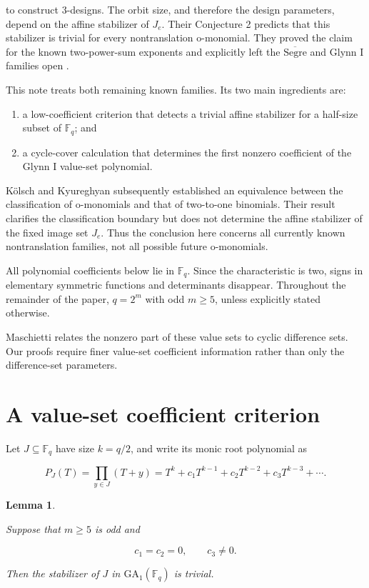 \documentclass[11pt]{article}
\newtheorem{lemma}[theorem]{Lemma}
\begin{document}
to construct \(3\)-designs. The orbit size, and therefore the design parameters,
depend on the affine stabilizer of \(J_e\). Their Conjecture 2 predicts that this
stabilizer is trivial for every nontranslation o-monomial. They proved the claim
for the known two-power-sum exponents and explicitly left the
\(\overline{\mathrm{Segre}}\) and Glynn I families open \cite[after Corollary~30]{ding-tang}.

This note treats both remaining known families. Its two main ingredients are:

\begin{enumerate}
\item a low-coefficient criterion that detects a trivial affine stabilizer for a
half-size subset of \(\mathbb F_q\); and
\item a cycle-cover calculation that determines the first nonzero coefficient of
the Glynn I value-set polynomial.

\end{enumerate}

Kölsch and Kyureghyan \cite{kolsch-kyureghyan} subsequently established an equivalence between the
classification of o-monomials and that of two-to-one binomials. Their result
clarifies the classification boundary but does not determine the affine
stabilizer of the fixed image set \(J_e\). Thus the conclusion here concerns all
currently known nontranslation families, not all possible future o-monomials.

All polynomial coefficients below lie in \(\mathbb F_q\). Since the
characteristic is two, signs in elementary symmetric functions and determinants
disappear. Throughout the remainder of the paper, \(q=2^m\) with odd
\(m\ge5\), unless explicitly stated otherwise.

Maschietti \cite{maschietti} relates the nonzero part of these value sets to cyclic difference
sets. Our proofs require finer value-set coefficient information rather than
only the difference-set parameters.

\section{A value-set coefficient criterion}


Let \(J\subseteq\mathbb F_q\) have size \(k=q/2\), and write its monic root
polynomial as

\[
P_J(T)=\prod_{y\in J}(T+y)
=T^k+c_1T^{k-1}+c_2T^{k-2}+c_3T^{k-3}+\cdots.
\]

\Needspace{0.18\textheight}
\begin{lemma}
\label{lem:criterion}

Suppose that \(m\ge5\) is odd and

\[
c_1=c_2=0,\qquad c_3\ne0.
\]

Then the stabilizer of \(J\) in \(\mathrm{GA}_1(\mathbb F_q)\) is trivial.

\end{lemma}
\end{document}
